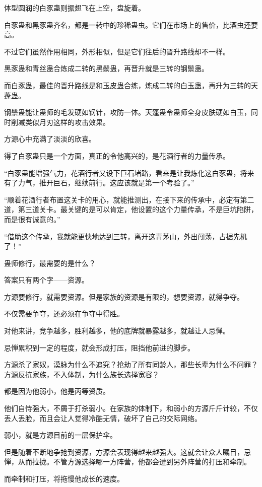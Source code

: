 \begin{this_body}
体型圆润的白豕蛊则振翅飞在上空，盘旋着。

白豕蛊和黑豕蛊齐名，都是一转中的珍稀蛊虫。它们在市场上的售价，比酒虫还要高。

不过它们虽然作用相同，外形相似，但是它们往后的晋升路线却不一样。

黑豕蛊和青丝蛊合炼成二转的黑鬃蛊，再晋升就是三转的钢鬃蛊。

而白豕蛊，最佳的晋升路线是和玉皮蛊合练，炼成二转的白玉蛊，再升为三转的天蓬蛊。

钢鬃蛊能让蛊师的毛发硬如钢针，攻防一体。天蓬蛊令蛊师全身皮肤硬如白玉，同时削减类似月刃这样的攻击效果。

方源心中充满了淡淡的欣喜。

得了白豕蛊只是一个方面，真正的令他高兴的，是花酒行者的力量传承。

“白豕蛊能增强气力，花酒行者又设下巨石堵路，看来是让我炼化这白豕蛊，将来有了力气，推开巨石，继续前行。这应该就是第一个考验了。”

“顺着花酒行者布置这关卡的用心，就能推测出，在接下来的传承中，必定有第二道，第三道关卡。最关键的是可以肯定，他设置的这个力量传承，不是巨坑陷阱，而是很有诚意的。”

“借助这个传承，我就能更快地达到三转，离开这青茅山，外出闯荡，占据先机了！”

蛊师修行，最需要的是什么？

答案只有两个字——资源。

方源要修行，就需要资源。但是家族的资源是有限的，想要资源，就得争夺。

不仅需要争夺，还必须在争夺中得胜。

对他来讲，竞争越多，胜利越多，他的底牌就暴露越多，就越让人忌惮。

忌惮累积到一定的程度，就会形成打压，阻挡他前进的脚步。

方源杀了家奴，漠脉为什么不追究？抢劫了所有同龄人，那些长辈为什么不问罪？方源反抗家族，不入体制，为什么族长选择宽容？

都是因为他弱小，他是丙等资质。

他们自恃强大，不屑于打杀弱小。在家族的体制下，和弱小的方源斤斤计较，不仅丢人丢脸，而且会让人觉得冷酷无情，破坏了自己的交际网络。

弱小，就是方源目前的一层保护伞。

但是随着不断地争抢到资源，方源会表现得越来越强大。这就会让众人瞩目，忌惮，从而拉拢。不管方源选择哪一方阵营，他都会遭到另外阵营的打压和牵制。

而牵制和打压，将拖慢他成长的速度。


\end{this_body}

